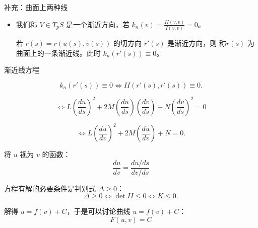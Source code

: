 \documentclass[lang=cn,10pt,thmcnt=section]{elegantbook}
\begin{document}
补充：曲面上两种线
\begin{itemize}
    \item 我们称 \( V \in T_pS \) 是一个渐近方向，若 \( k_n(v) = \frac{II(v, v)}{I(v,v)} = 0 \)。

    若 \( r(s) = r(u(s), v(s)) \) 的切方向 \( r'(s) \) 是渐近方向，则 称\( r(s) \) 为曲面上的一条渐近线。此时 \( k_n(r'(s)) \equiv 0 \)。  
\end{itemize}

渐近线方程

\[ k_n(r'(s)) \equiv 0 \iff II(r'(s), r'(s)) \equiv 0. \]

\[
\Leftrightarrow L\left( \frac{du}{ds} \right)^2 + 2M\left( \frac{du}{ds} \right) \left( \frac{dv}{ds} \right) + N\left( \frac{dv}{ds} \right)^2 = 0
\]

\[
\Leftrightarrow L\left( \frac{du}{dv} \right)^2 + 2M\left( \frac{du}{dv} \right) + N = 0.
\]

将 \( u \) 视为 \( v \) 的函数：
\[
\frac{du}{dv} = \frac{du/ds}{dv/ds}
\]

方程有解的必要条件是判别式 \( \Delta \geq 0 \)：
\[
\Delta \geq 0 \iff \det II\leq 0 \iff K \leq 0.
\]

解得 \( u = f(v) + C \)，于是可以讨论曲线 \( u = f(v) + C \)：
\[
F(u,v) = C
\]
\end{document}
